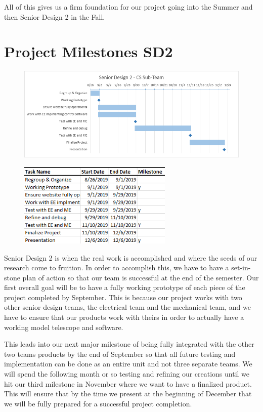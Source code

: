 \documentclass[12pt]{report}
\begin{document}
All of this gives us a firm foundation for our project going into the Summer and then Senior Design 2 in the Fall.

\section*{Project Milestones SD2}

\begin{figure}[h]
	\centering
	\includegraphics[width=\linewidth]{SD2Gantt}
\end{figure}

\begin{figure}[h]
	\centering
	\includegraphics[width=0.6\linewidth, height=4.0cm]{SD2Dates}
\end{figure}

Senior Design 2 is when the real work is accomplished and where the seeds of our research come to fruition. In order to accomplish this, we have to have a set-in-stone plan of action so that our team is successful at the end of the semester. Our first overall goal will be to have a fully working prototype of each piece of the project completed by September. This is because our project works with two other senior design teams, the electrical team and the mechanical team, and we have to ensure that our products work with theirs in order to actually have a working model telescope and software.

This leads into our next major milestone of being fully integrated with the other two teams products by the end of September so that all future testing and implementation can be done as an entire unit and not three separate teams. We will spend the following month or so testing and refining our creations until we hit our third milestone in November where we want to have a finalized product. This will ensure that by the time we present at the beginning of December that we will be fully prepared for a successful project completion.
\end{document}
